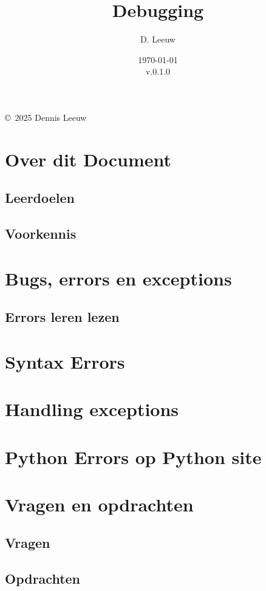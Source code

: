 \documentclass[a4paper,12pt,twoside,openright,titlepage]{book}
\author{D. Leeuw}
\title{Debugging}
\date{\today\\v.0.1.0}
\begin{document}

\maketitle

\copyright\ 2025 Dennis Leeuw\\




\frontmatter
\chapter{Over dit Document}
\section{Leerdoelen}

\section{Voorkennis}


\tableofcontents

\mainmatter

\chapter{Bugs, errors en exceptions}

\section{Errors leren lezen}


\chapter{Syntax Errors}


\chapter{Handling exceptions}


\chapter{Python Errors op Python site}


\chapter{Vragen en opdrachten}
\section{Vragen}

\section{Opdrachten}


\printindex
\end{document}
